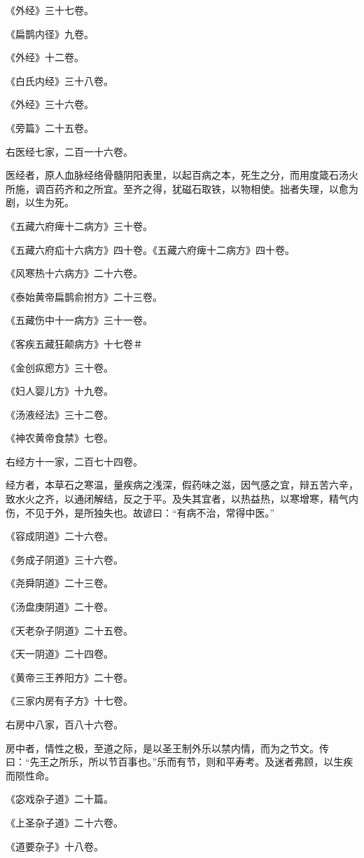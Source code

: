 \documentclass[]{article}
\begin{document}
《外经》三十七卷。

《扁鹊内径》九卷。

《外经》十二卷。

《白氏内经》三十八卷。

《外经》三十六卷。

《旁篇》二十五卷。

右医经七家，二百一十六卷。

医经者，原人血脉经络骨髓阴阳表里，以起百病之本，死生之分，而用度箴石汤火所施，调百药齐和之所宜。至齐之得，犹磁石取铁，以物相使。拙者失理，以愈为剧，以生为死。

《五藏六府痺十二病方》三十卷。

《五藏六府疝十六病方》四十卷。《五藏六府痺十二病方》四十卷。

《风寒热十六病方》二十六卷。

《泰始黄帝扁鹊俞拊方》二十三卷。

《五藏伤中十一病方》三十一卷。

《客疾五藏狂颠病方》十七卷＃

《金创疭瘛方》三十卷。

《妇人婴儿方》十九卷。

《汤液经法》三十二卷。

《神农黄帝食禁》七卷。

右经方十一家，二百七十四卷。

经方者，本草石之寒温，量疾病之浅深，假药味之滋，因气感之宜，辩五苦六辛，致水火之齐，以通闭解结，反之于平。及失其宜者，以热益热，以寒增寒，精气内伤，不见于外，是所独失也。故谚曰：``有病不治，常得中医。''

《容成阴道》二十六卷。

《务成子阴道》三十六卷。

《尧舜阴道》二十三卷。

《汤盘庚阴道》二十卷。

《天老杂子阴道》二十五卷。

《天一阴道》二十四卷。

《黄帝三王养阳方》二十卷。

《三家内房有子方》十七卷。

右房中八家，百八十六卷。

房中者，情性之极，至道之际，是以圣王制外乐以禁内情，而为之节文。传曰：``先王之所乐，所以节百事也。''乐而有节，则和平寿考。及迷者弗顾，以生疾而陨性命。

《宓戏杂子道》二十篇。

《上圣杂子道》二十六卷。

《道要杂子》十八卷。
\end{document}
